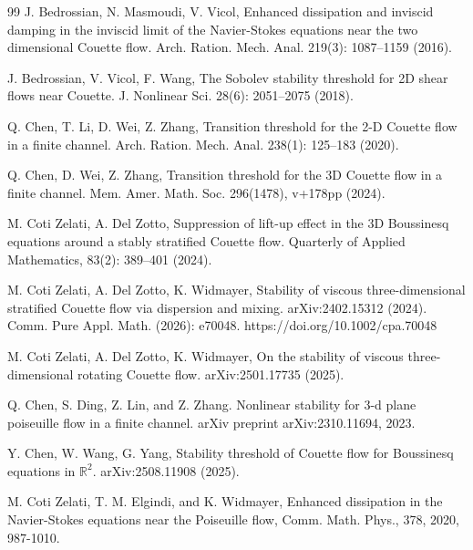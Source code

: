 \documentclass[12pt]{article}
\numberwithin{equation}{section}
\begin{document}
\begin{thebibliography}{99}
  		J. Bedrossian, N. Masmoudi, V. Vicol, Enhanced dissipation and inviscid damping in the inviscid limit of the Navier-Stokes equations near the two dimensional Couette flow. Arch. Ration. Mech. Anal. 219(3): 1087--1159  (2016).
  		
  		J. Bedrossian, V. Vicol, F. Wang, The Sobolev stability threshold for 2D shear flows near Couette. J. Nonlinear Sci. 28(6): 2051--2075 (2018).
  	
  		
  		
  		Q. Chen, T. Li, D. Wei, Z. Zhang, Transition threshold for the 2-D Couette flow in a finite channel. Arch. Ration. Mech. Anal. 238(1): 125--183 (2020).
  		
  		Q. Chen, D. Wei, Z. Zhang, Transition threshold for the 3D Couette flow in a finite channel. Mem. Amer. Math. Soc. 296(1478), v+178pp (2024).
  		
  		M. Coti Zelati, A. Del Zotto, Suppression of lift-up effect in the 3D Boussinesq equations around a stably stratified Couette flow. Quarterly of Applied Mathematics, 83(2): 389–401 (2024).
  		
  		M. Coti Zelati, A. Del Zotto, K. Widmayer, Stability of viscous three-dimensional stratified Couette flow via dispersion and mixing. arXiv:2402.15312 (2024).
  		Comm. Pure Appl. Math. (2026): e70048. https://doi.org/10.1002/cpa.70048
  		
  		
  		M. Coti Zelati, A. Del Zotto, K. Widmayer, On the stability of viscous three-dimensional rotating Couette flow. arXiv:2501.17735 (2025).	
  		
  		Q. Chen, S. Ding, Z. Lin, and Z. Zhang. Nonlinear stability for 3-d plane poiseuille flow in a
  		finite channel. arXiv preprint arXiv:2310.11694, 2023.
  		
        Y. Chen, W. Wang, G. Yang, Stability threshold of Couette flow for Boussinesq equations in $\mathbb{R}^2$. 	arXiv:2508.11908 (2025).
  		
  		 M. Coti Zelati, T. M. Elgindi, and K. Widmayer, Enhanced dissipation in the Navier-Stokes equations near the Poiseuille flow, Comm. Math. Phys., 378, 2020, 987-1010.
  		

\end{thebibliography}
\end{document}
